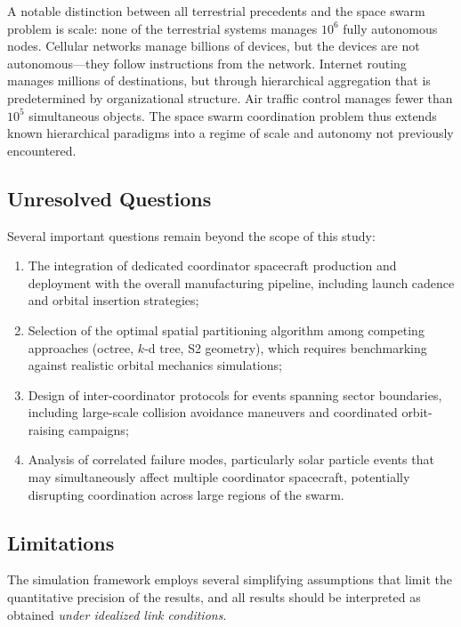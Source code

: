 \documentclass[journal]{IEEEtran}
\begin{document}
A notable distinction between all terrestrial precedents and the space swarm problem is scale: none of the terrestrial systems manages $10^6$ fully autonomous nodes. Cellular networks manage billions of devices, but the devices are not autonomous---they follow instructions from the network. Internet routing manages millions of destinations, but through hierarchical aggregation that is predetermined by organizational structure. Air traffic control manages fewer than $10^5$ simultaneous objects. The space swarm coordination problem thus extends known hierarchical paradigms into a regime of scale and autonomy not previously encountered.

\subsection{Unresolved Questions}

Several important questions remain beyond the scope of this study:

\begin{enumerate}
    \item The integration of dedicated coordinator spacecraft production and deployment with the overall manufacturing pipeline, including launch cadence and orbital insertion strategies;
    \item Selection of the optimal spatial partitioning algorithm among competing approaches (octree, $k$-d tree, S2 geometry), which requires benchmarking against realistic orbital mechanics simulations;
    \item Design of inter-coordinator protocols for events spanning sector boundaries, including large-scale collision avoidance maneuvers and coordinated orbit-raising campaigns;
    \item Analysis of correlated failure modes, particularly solar particle events that may simultaneously affect multiple coordinator spacecraft, potentially disrupting coordination across large regions of the swarm.
\end{enumerate}

\subsection{Limitations}

The simulation framework employs several simplifying assumptions that limit the quantitative precision of the results, and all results should be interpreted as obtained \emph{under idealized link conditions}.
\end{document}
